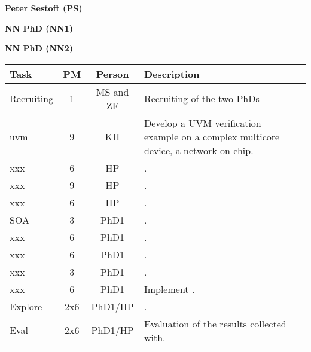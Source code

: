 \documentclass[fleqn,12pt]{article}
\begin{document}
{\bf Peter Sestoft (PS)} 

{\bf NN PhD (NN1)} 

{\bf NN PhD (NN2)} 


%


\begin{table*}%
{\small
  \begin{center}
    \begin{tabular}{lccp{110mm}l}
      \toprule
      Task          & PM  & Person &  Description \\
      \midrule
      Recruiting  & 1 & MS and ZF & Recruiting of the two PhDs \\
      \midrule
      uvm     &  9      & KH     & Develop a UVM verification example on a complex multicore device, a network-on-chip.\\
      xxx     &  6      & HP     & .\\
      xxx    &  9      & HP     & .\\
      xxx     &  6      & HP     & .\\
      \midrule
      SOA  & 3      & PhD1     &  . \\
      xxx  & 6      & PhD1     &  . \\
      xxx  & 6      & PhD1     &  . \\
      xxx  & 3      & PhD1     &  . \\
      xxx  & 6      & PhD1     &  Implement . \\
      \midrule
      Explore   &    2x6 & PhD1/HP    &  .\\
      Eval & 2x6 & PhD1/HP & Evaluation of the results collected with. \\
      \bottomrule
    \end{tabular}
  \end{center}
}
\end{table*}
\end{document}
